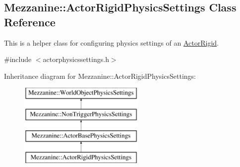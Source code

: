 \hypertarget{classMezzanine_1_1ActorRigidPhysicsSettings}{
\subsection{Mezzanine::ActorRigidPhysicsSettings Class Reference}
\label{classMezzanine_1_1ActorRigidPhysicsSettings}
}


This is a helper class for configuring physics settings of an \hyperlink{classMezzanine_1_1ActorRigid}{ActorRigid}.  




{\ttfamily \#include $<$actorphysicssettings.h$>$}

Inheritance diagram for Mezzanine::ActorRigidPhysicsSettings:\begin{figure}[H]
\begin{center}
\leavevmode
\includegraphics[height=4.000000cm]{classMezzanine_1_1ActorRigidPhysicsSettings}
\end{center}
\end{figure}

